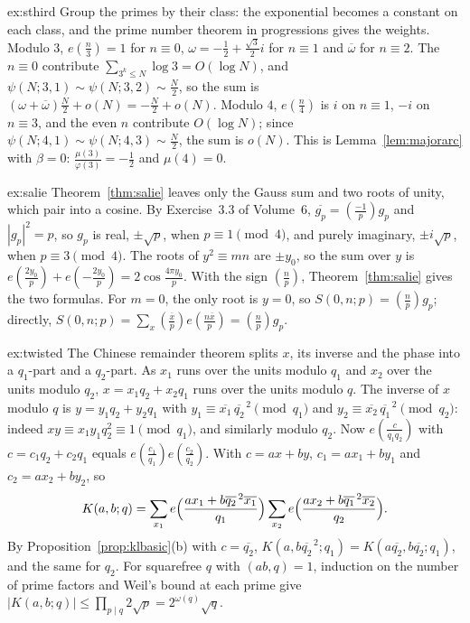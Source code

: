 \begin{solution}{ex:sthird}
\idea Group the primes by their class: the exponential becomes a constant on each class, and the prime number theorem in progressions gives the weights.
\writeup Modulo $3$, $e(\frac n3)=1$ for $n\equiv0$, $\omega=-\frac12+\frac{\sqrt3}2i$ for $n\equiv1$ and $\overline\omega$ for $n\equiv2$. The $n\equiv0$ contribute $\sum_{3^k\le N}\log3=O(\log N)$, and $\psi(N;3,1)\sim\psi(N;3,2)\sim\frac N2$, so the sum is $(\omega+\overline\omega)\frac N2+o(N)=-\frac N2+o(N)$. Modulo $4$, $e(\frac n4)$ is $i$ on $n\equiv1$, $-i$ on $n\equiv3$, and the even $n$ contribute $O(\log N)$; since $\psi(N;4,1)\sim\psi(N;4,3)\sim\frac N2$, the sum is $o(N)$. This is Lemma~\ref{lem:majorarc} with $\beta=0$: $\frac{\mu(3)}{\varphi(3)}=-\frac12$ and $\mu(4)=0$.
\end{solution}

\begin{solution}{ex:salie}
\idea Theorem~\ref{thm:salie} leaves only the Gauss sum and two roots of unity, which pair into a cosine.
\writeup By Exercise~3.3 of Volume~6, $\overline{g_p}=(\frac{-1}p)g_p$ and $|g_p|^2=p$, so $g_p$ is real, $\pm\sqrt p$, when $p\equiv1\pmod4$, and purely imaginary, $\pm i\sqrt p$, when $p\equiv3\pmod4$. The roots of $y^2\equiv mn$ are $\pm y_0$, so the sum over $y$ is $e(\frac{2y_0}p)+e(-\frac{2y_0}p)=2\cos\frac{4\pi y_0}p$. With the sign $(\frac np)$, Theorem~\ref{thm:salie} gives the two formulas. For $m=0$, the only root is $y=0$, so $S(0,n;p)=(\frac np)g_p$; directly, $S(0,n;p)=\sum_x(\frac{\overline x}p)e(\frac{n\overline x}p)=(\frac np)g_p$.
\end{solution}

\begin{solution}{ex:twisted}
\idea The Chinese remainder theorem splits $x$, its inverse and the phase into a $q_1$-part and a $q_2$-part.
\writeup As $x_1$ runs over the units modulo $q_1$ and $x_2$ over the units modulo $q_2$, $x=x_1q_2+x_2q_1$ runs over the units modulo $q$. The inverse of $x$ modulo $q$ is $y=y_1q_2+y_2q_1$ with $y_1\equiv\overline{x_1}\,\overline{q_2}^{\,2}\pmod{q_1}$ and $y_2\equiv\overline{x_2}\,\overline{q_1}^{\,2}\pmod{q_2}$: indeed $xy\equiv x_1y_1q_2^2\equiv1\pmod{q_1}$, and similarly modulo $q_2$. Now $e(\frac c{q_1q_2})$ with $c=c_1q_2+c_2q_1$ equals $e(\frac{c_1}{q_1})e(\frac{c_2}{q_2})$. With $c=ax+by$, $c_1=ax_1+by_1$ and $c_2=ax_2+by_2$, so
\[
K(a,b;q)=\sum_{x_1}e\Bigl(\frac{ax_1+b\overline{q_2}^{\,2}\overline{x_1}}{q_1}\Bigr)\sum_{x_2}e\Bigl(\frac{ax_2+b\overline{q_1}^{\,2}\overline{x_2}}{q_2}\Bigr).
\]
By Proposition~\ref{prop:klbasic}(b) with $c=\overline{q_2}$, $K(a,b\overline{q_2}^{\,2};q_1)=K(a\overline{q_2},b\overline{q_2};q_1)$, and the same for $q_2$. For squarefree $q$ with $(ab,q)=1$, induction on the number of prime factors and Weil's bound at each prime give $|K(a,b;q)|\le\prod_{p\mid q}2\sqrt p=2^{\omega(q)}\sqrt q$.
\end{solution}

